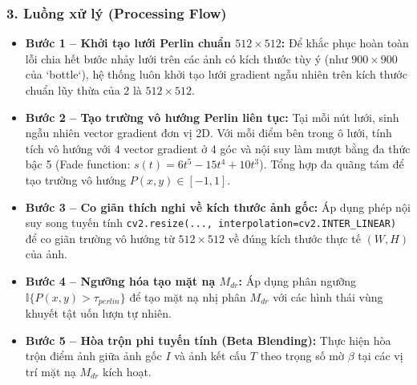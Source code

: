 \subsubsection*{3. Luồng xử lý (Processing Flow)}
\begin{itemize}
    \item \textbf{Bước 1 -- Khởi tạo lưới Perlin chuẩn $512 \times 512$:} Để khắc phục hoàn toàn lỗi chia hết bước nhảy lưới trên các ảnh có kích thước tùy ý (như $900 \times 900$ của `bottle`), hệ thống luôn khởi tạo lưới gradient ngẫu nhiên trên kích thước chuẩn lũy thừa của 2 là $512 \times 512$.
    \item \textbf{Bước 2 -- Tạo trường vô hướng Perlin liên tục:} Tại mỗi nút lưới, sinh ngẫu nhiên vector gradient đơn vị 2D. Với mỗi điểm bên trong ô lưới, tính tích vô hướng với 4 vector gradient ở 4 góc và nội suy làm mượt bằng đa thức bậc 5 (Fade function: $s(t) = 6t^5 - 15t^4 + 10t^3$). Tổng hợp đa quãng tám để tạo trường vô hướng $P(x, y) \in [-1, 1]$.
    \item \textbf{Bước 3 -- Co giãn thích nghi về kích thước ảnh gốc:} Áp dụng phép nội suy song tuyến tính \texttt{cv2.resize(..., interpolation=cv2.INTER\_LINEAR)} để co giãn trường vô hướng từ $512 \times 512$ về đúng kích thước thực tế $(W, H)$ của ảnh.
    \item \textbf{Bước 4 -- Ngưỡng hóa tạo mặt nạ $M_{dr}$:} Áp dụng phân ngưỡng $\mathbb{I}\{P(x, y) > \tau_{perlin}\}$ để tạo mặt nạ nhị phân $M_{dr}$ với các hình thái vùng khuyết tật uốn lượn tự nhiên.
    \item \textbf{Bước 5 -- Hòa trộn phi tuyến tính (Beta Blending):} Thực hiện hòa trộn điểm ảnh giữa ảnh gốc $I$ và ảnh kết cấu $T$ theo trọng số mờ $\beta$ tại các vị trí mặt nạ $M_{dr}$ kích hoạt.
\end{itemize}

